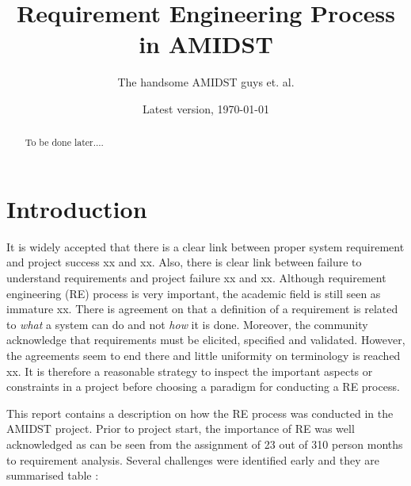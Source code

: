 \documentclass[11pt, oneside]{article}   	%
\title{Requirement Engineering Process in AMIDST}
\author{The handsome AMIDST guys et. al.}
\date{Latest version, \today}							%
\begin{document}
\maketitle

\begin{abstract}
To be done later....
\end{abstract}

\section{Introduction}

It is widely accepted that there is a clear link between proper system requirement and project success xx and xx.  Also, there is clear link between failure to understand requirements and project failure xx and xx.  Although requirement engineering (RE) process is very important, the academic field is still seen as immature xx. There is agreement on that a definition of a requirement is related to \emph{what} a system can do and not \emph{how} it is done.  Moreover, the community acknowledge that requirements must be elicited, specified and validated.  However, the agreements seem to end there and little uniformity on terminology is reached xx. It is therefore a reasonable strategy to inspect the important aspects or constraints in a project before choosing a paradigm for conducting a RE process.

This report contains a description on how the RE process was conducted in the AMIDST project.  Prior to project start, the importance of RE was well acknowledged as can be seen from the assignment of 23 out of 310 person months to requirement analysis.  Several challenges were identified early and they are summarised table :
\end{document}
